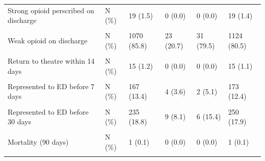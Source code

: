 \documentclass[
  letterpaper,
  DIV=11,
  numbers=noendperiod]{scrreprt}
\begin{document}
\begin{table}
{\begin{tabular*}{\linewidth}{@{\extracolsep{\fill}}llllll}
{Strong opioid perscribed on discharge} & {N (\%)} & {19 (1.5)} & {0 (0.0)} & {0 (0.0)} & {19 (1.4)} \\ 
{\cellcolor[HTML]{F2F2F2}{New strong opioids on discharge}} & {\cellcolor[HTML]{F2F2F2}{N (\%)}} & {\cellcolor[HTML]{F2F2F2}{0 (NaN)}} & {\cellcolor[HTML]{F2F2F2}{0 (NaN)}} & {\cellcolor[HTML]{F2F2F2}{0 (NaN)}} & {\cellcolor[HTML]{F2F2F2}{0 (NaN)}} \\ 
{Weak opioid on discharge} & {N (\%)} & {1070 (85.8)} & {23 (20.7)} & {31 (79.5)} & {1124 (80.5)} \\ 
{\cellcolor[HTML]{F2F2F2}{Return to theatre within 7 days}} & {\cellcolor[HTML]{F2F2F2}{N (\%)}} & {\cellcolor[HTML]{F2F2F2}{7 (0.6)}} & {\cellcolor[HTML]{F2F2F2}{0 (0.0)}} & {\cellcolor[HTML]{F2F2F2}{0 (0.0)}} & {\cellcolor[HTML]{F2F2F2}{7 (0.5)}} \\ 
{Return to theatre within 14 days} & {N (\%)} & {15 (1.2)} & {0 (0.0)} & {0 (0.0)} & {15 (1.1)} \\ 
{\cellcolor[HTML]{F2F2F2}{Return to theatre within 30 days}} & {\cellcolor[HTML]{F2F2F2}{N (\%)}} & {\cellcolor[HTML]{F2F2F2}{19 (1.5)}} & {\cellcolor[HTML]{F2F2F2}{0 (0.0)}} & {\cellcolor[HTML]{F2F2F2}{0 (0.0)}} & {\cellcolor[HTML]{F2F2F2}{19 (1.4)}} \\ 
{Represented to ED before 7 days} & {N (\%)} & {167 (13.4)} & {4 (3.6)} & {2 (5.1)} & {173 (12.4)} \\ 
{\cellcolor[HTML]{F2F2F2}{Represented to ED before 14 days}} & {\cellcolor[HTML]{F2F2F2}{N (\%)}} & {\cellcolor[HTML]{F2F2F2}{229 (18.4)}} & {\cellcolor[HTML]{F2F2F2}{8 (7.2)}} & {\cellcolor[HTML]{F2F2F2}{6 (15.4)}} & {\cellcolor[HTML]{F2F2F2}{243 (17.4)}} \\ 
{Represented to ED before 30 days} & {N (\%)} & {235 (18.8)} & {9 (8.1)} & {6 (15.4)} & {250 (17.9)} \\ 
{\cellcolor[HTML]{F2F2F2}{Died during admission}} & {\cellcolor[HTML]{F2F2F2}{N (\%)}} & {\cellcolor[HTML]{F2F2F2}{1 (0.1)}} & {\cellcolor[HTML]{F2F2F2}{0 (0.0)}} & {\cellcolor[HTML]{F2F2F2}{0 (0.0)}} & {\cellcolor[HTML]{F2F2F2}{1 (0.1)}} \\ 
{Mortality (90 days)} & {N (\%)} & {1 (0.1)} & {0 (0.0)} & {0 (0.0)} & {1 (0.1)} \\ 
{\cellcolor[HTML]{F2F2F2}{Mortality (1 year)}} & {\cellcolor[HTML]{F2F2F2}{N (\%)}} & {\cellcolor[HTML]{F2F2F2}{4 (0.4)}} & {\cellcolor[HTML]{F2F2F2}{0 (0.0)}} & {\cellcolor[HTML]{F2F2F2}{0 (0.0)}} & {\cellcolor[HTML]{F2F2F2}{4 (0.3)}} \\ 
\bottomrule
\end{tabular*}

}

\end{table}%
\end{document}
